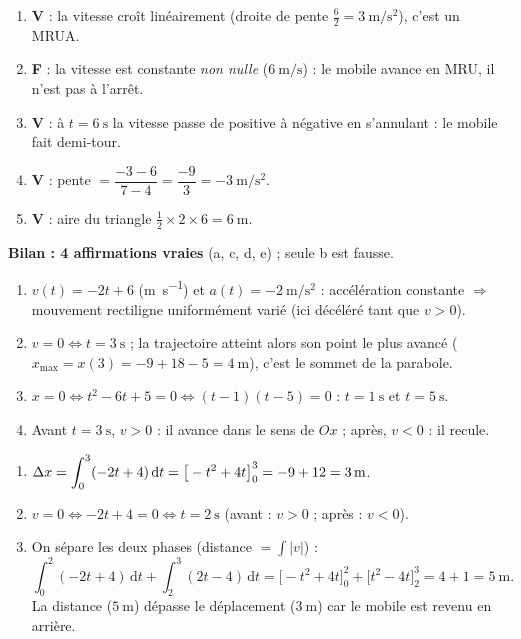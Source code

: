 \documentclass[11pt,a4paper]{article}
\begin{document}

\begin{corrige}
\begin{enumerate}[label=\alph*)]
  \item \textbf{V} : la vitesse croît linéairement (droite de pente $\frac{6}{2}=\qty{3}{\metre\per\second\squared}$), c'est un MRUA.
  \item \textbf{F} : la vitesse est constante \emph{non nulle} ($\qty{6}{\metre\per\second}$) : le mobile avance en MRU, il n'est pas à l'arrêt.
  \item \textbf{V} : à $t=\qty{6}{\second}$ la vitesse passe de positive à négative en s'annulant : le mobile fait demi-tour.
  \item \textbf{V} : pente $=\dfrac{-3-6}{7-4}=\dfrac{-9}{3}=\qty{-3}{\metre\per\second\squared}$.
  \item \textbf{V} : aire du triangle $\tfrac12\times2\times6=\qty{6}{\metre}$.
\end{enumerate}
\textbf{Bilan : 4 affirmations vraies} (a, c, d, e) ; seule b est fausse.
\end{corrige}

\begin{corrige}
\begin{enumerate}[label=\alph*)]
  \item $v(t)=-2t+6$ (\si{\metre\per\second}) et $a(t)=\qty{-2}{\metre\per\second\squared}$ : accélération constante $\Rightarrow$ mouvement rectiligne uniformément varié (ici décéléré tant que $v>0$).
  \item $v=0 \Leftrightarrow t=\qty{3}{\second}$ ; la trajectoire atteint alors son point le plus avancé ($x_{\max}=x(3)=-9+18-5=\qty{4}{\metre}$), c'est le sommet de la parabole.
  \item $x=0 \Leftrightarrow t^2-6t+5=0 \Leftrightarrow (t-1)(t-5)=0$ : $t=\qty{1}{\second}$ et $t=\qty{5}{\second}$.
  \item Avant $t=\qty{3}{\second}$, $v>0$ : il avance dans le sens de $Ox$ ; après, $v<0$ : il recule.
\end{enumerate}
\end{corrige}

\begin{corrige}
\begin{enumerate}[label=\alph*)]
  \item $\displaystyle \Delta x=\int_0^3(-2t+4)\,\mathrm{d}t=\big[-t^2+4t\big]_0^3=-9+12=\qty{3}{\metre}$.
  \item $v=0 \Leftrightarrow -2t+4=0 \Leftrightarrow t=\qty{2}{\second}$ (avant : $v>0$ ; après : $v<0$).
  \item On sépare les deux phases (distance $=\int|v|$) :
        \[ \int_0^2(-2t+4)\,\mathrm{d}t+\int_2^3(2t-4)\,\mathrm{d}t
           =\big[-t^2+4t\big]_0^2+\big[t^2-4t\big]_2^3=4+1=\qty{5}{\metre}. \]
        La distance ($\qty{5}{\metre}$) dépasse le déplacement ($\qty{3}{\metre}$) car le mobile est revenu en arrière.
\end{enumerate}
\end{corrige}
\end{document}
